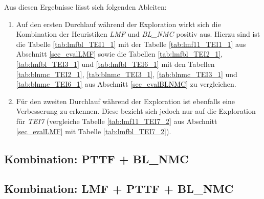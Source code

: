 \begin{multicols}{2}
\columnbreak
{}
\end{multicols}
\noindent
Aus diesen Ergebnisse lässt sich folgenden Ableiten:
\begin{enumerate}
\item Auf den ersten Durchlauf während der Exploration wirkt sich die Kombination der Heuristiken \emph{LMF} und \emph{BL\_NMC} positiv aus. Hierzu sind ist die Tabelle \ref{tab:lmfbl_TEI1_1} mit der Tabelle \ref{tab:lmf11_TEI1_1} aus Abschnitt \ref{sec_evalLMF} sowie die Tabellen \ref{tab:lmfbl_TEI2_1}, \ref{tab:lmfbl_TEI3_1} und \ref{tab:lmfbl_TEI6_1} mit den Tabellen \ref{tab:blnmc_TEI2_1}, \ref{tab:blnmc_TEI3_1}, \ref{tab:blnmc_TEI3_1} und \ref{tab:blnmc_TEI6_1} aus Abschnitt \ref{sec_evalBLNMC} zu vergleichen.
\item Für den zweiten Durchlauf während der Exploration ist ebenfalls eine Verbesserung zu erkennen. Diese bezieht sich jedoch nur auf die Exploration für \emph{TEI7} (vergleiche Tabelle \ref{tab:lmf11_TEI7_2} aus Abschnitt \ref{sec_evalLMF} mit Tabelle \ref{tab:lmfbl_TEI7_2}).
\end{enumerate}

\subsection{Kombination: PTTF + BL\_NMC}
\subsection{Kombination: LMF + PTTF + BL\_NMC}